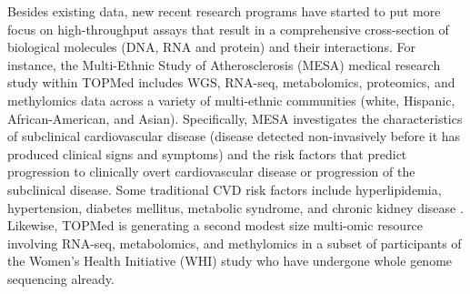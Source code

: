 \documentclass[letter]{bioinfo}
\begin{document}
	
	Besides existing data, new recent research programs have started to put more focus on high-throughput assays that result in a comprehensive cross-section of biological molecules (DNA, RNA and protein) and their interactions. For instance, the Multi-Ethnic Study of Atherosclerosis (MESA) medical research study \citep{Bild:2002:MultiEthnic} within TOPMed includes WGS, RNA-seq, metabolomics, proteomics, and methylomics data across a variety of multi-ethnic communities (white, Hispanic, African-American, and Asian).  Specifically, MESA investigates the characteristics of subclinical cardiovascular disease (disease detected non-invasively before it has produced clinical signs and symptoms) and the risk factors that predict progression to clinically overt cardiovascular disease or progression of the subclinical disease.  Some traditional CVD risk factors include hyperlipidemia, hypertension, diabetes mellitus, metabolic syndrome, and chronic kidney disease \citep{Leopold:2018:Emerging}.  Likewise, TOPMed is generating a second modest size multi-omic resource involving RNA-seq, metabolomics, and methylomics in a subset of participants of the Women's Health Initiative (WHI) study \citep{NHLBI:1991:Women} who have undergone whole genome sequencing already.  
\end{document}
